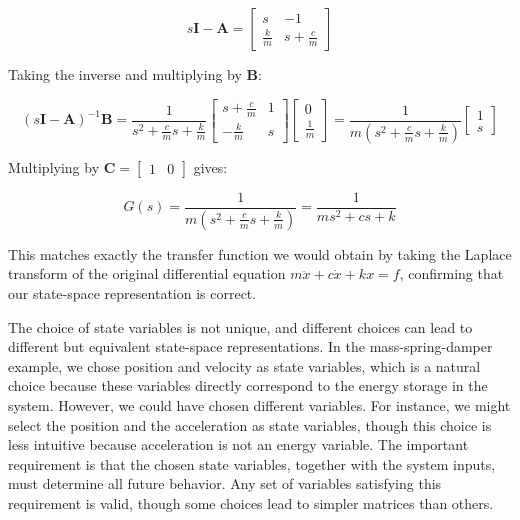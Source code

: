 \begin{equation}
s\mathbf{I} - \mathbf{A} =
\begin{bmatrix}
s & -1 \\
\frac{k}{m} & s + \frac{c}{m}
\end{bmatrix}
\end{equation}

Taking the inverse and multiplying by $\mathbf{B}$:

\begin{equation}
(s\mathbf{I} - \mathbf{A})^{-1}\mathbf{B} =
\frac{1}{s^2 + \frac{c}{m}s + \frac{k}{m}}
\begin{bmatrix}
s + \frac{c}{m} & 1 \\
-\frac{k}{m} & s
\end{bmatrix}
\begin{bmatrix}
0 \\ \frac{1}{m}
\end{bmatrix}
=
\frac{1}{m\left(s^2 + \frac{c}{m}s + \frac{k}{m}\right)}
\begin{bmatrix}
1 \\ s
\end{bmatrix}
\end{equation}

Multiplying by $\mathbf{C} = \begin{bmatrix} 1 & 0 \end{bmatrix}$ gives:

\begin{equation}
G(s) = \frac{1}{m\left(s^2 + \frac{c}{m}s + \frac{k}{m}\right)} = \frac{1}{ms^2 + cs + k}
\end{equation}

This matches exactly the transfer function we would obtain by taking the Laplace transform of the original differential equation $m\ddot{x} + c\dot{x} + kx = f$, confirming that our state-space representation is correct.

The choice of state variables is not unique, and different choices can lead to different but equivalent state-space representations. In the mass-spring-damper example, we chose position and velocity as state variables, which is a natural choice because these variables directly correspond to the energy storage in the system. However, we could have chosen different variables. For instance, we might select the position and the acceleration as state variables, though this choice is less intuitive because acceleration is not an energy variable. The important requirement is that the chosen state variables, together with the system inputs, must determine all future behavior. Any set of variables satisfying this requirement is valid, though some choices lead to simpler matrices than others.

